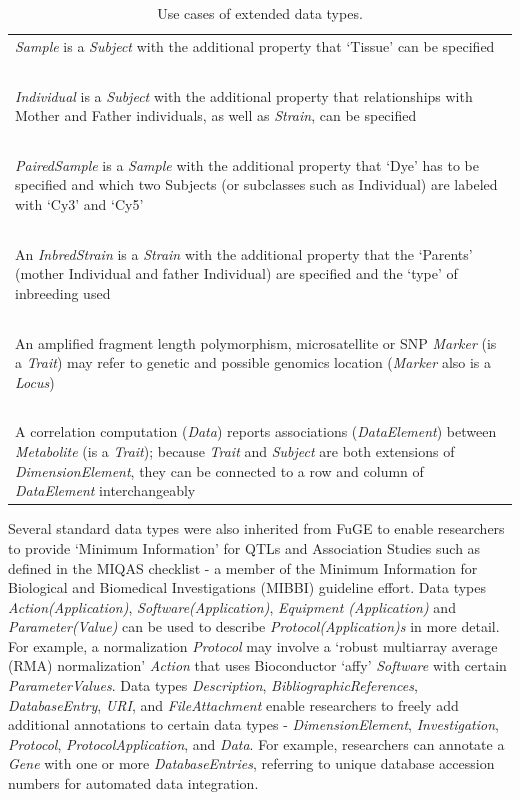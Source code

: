 \begin{table}
\begin{tabulary}{\linewidth}{L}
  \hline
  \textsl{Sample} is a \textsl{Subject} with the additional property that ‘Tissue’ can be specified\\
  ~\\
  \textsl{Individual} is a \textsl{Subject} with the additional property that relationships with Mother and Father individuals, as well as \textsl{Strain}, can be specified\\
  ~\\
  \textsl{PairedSample} is a \textsl{Sample} with the additional property that ‘Dye’ has to be specified and which two Subjects (or subclasses such as Individual) are labeled with ‘Cy3’ and ‘Cy5’\\
  ~\\
  An \textsl{InbredStrain} is a \textsl{Strain} with the additional property that the ‘Parents’ (mother Individual and father Individual) are specified and the ‘type’ of inbreeding used\\
  ~\\
  An amplified fragment length polymorphism, microsatellite or SNP \textsl{Marker} (is a \textsl{Trait}) may refer to genetic and possible genomics location (\textsl{Marker} also is a \textsl{Locus})\\
  ~\\
  A correlation computation (\textsl{Data}) reports associations (\textsl{DataElement}) between \textsl{Metabolite} (is a \textsl{Trait}); because \textsl{Trait} and \textsl{Subject} are both extensions of \textsl{DimensionElement}, they can be connected to a row and column of \textsl{DataElement} interchangeably\\
  \hline
\end{tabulary}
\caption[Use cases of extended data types]{Use cases of extended data types.}
\label{table:xgap_extension_usecases}
\end{table}

Several standard data types were also inherited from FuGE to enable researchers to provide ‘Minimum Information’ for QTLs and Association Studies such as defined in the MIQAS checklist\cite{xgap_miqas} - a member of the Minimum Information for Biological and Biomedical Investigations (MIBBI) guideline effort\cite{Taylor_2008}.
Data types \textsl{Action(Application)}, \textsl{Software(Application)}, \textsl{Equipment (Application)} and \textsl{Parameter(Value)} can be used to describe \textsl{Protocol(Application)s} in more detail.
For example, a normalization \textsl{Protocol} may involve a ‘robust multiarray average (RMA) normalization’ \textsl{Action} that uses Bioconductor ‘affy’ \textsl{Software}\cite{Irizarry_2003} with certain \textsl{ParameterValues}.
Data types \textsl{Description}, \textsl{BibliographicReferences}, \textsl{DatabaseEntry}, \textsl{URI}, and \textsl{FileAttachment} enable researchers to freely add additional annotations to certain data types - \textsl{DimensionElement}, \textsl{Investigation}, \textsl{Protocol}, \textsl{ProtocolApplication}, and \textsl{Data}.
For example, researchers can annotate a \textsl{Gene} with one or more \textsl{DatabaseEntries}, referring to unique database accession numbers for automated data integration.

